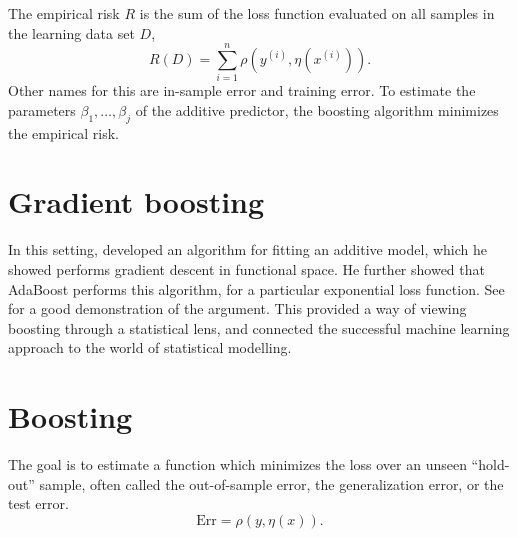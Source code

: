 The empirical risk $R$ is the sum of the loss function evaluated on all samples in the learning data set $D$,
\begin{equation}\label{eq:empirical-risk}
    R(D)=\sum_{i=1}^n\rho(y^{(i)},\eta(x^{(i)})).
\end{equation}
Other names for this are in-sample error and training error. To estimate the parameters $\beta_1,\ldots,\beta_j$ of the additive predictor, the boosting algorithm minimizes the empirical risk.

\section{Gradient boosting}
In this setting, \citet{friedman2000} developed an algorithm for fitting an additive model, which he showed performs gradient descent in functional space. He further showed that AdaBoost performs this algorithm, for a particular exponential loss function. See \citet{ESL} for a good demonstration of the argument. This provided a way of viewing boosting through a statistical lens, and connected the successful machine learning approach to the world of statistical modelling.

\section{Boosting}
The goal is to estimate a function which minimizes the loss over an unseen ``hold-out'' sample, often called the out-of-sample error, the generalization error, or the test error.
\begin{equation}
    \text{Err}=\rho(y,\eta(x)).
\end{equation}


